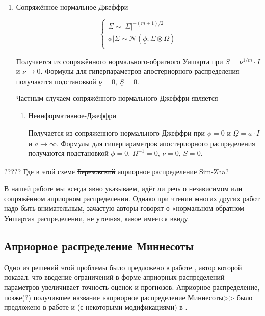 \documentclass[11pt]{article} %
\newcommand{\cN}{\mathcal{N}}
\newcommand{\prior}{\underline}
\begin{document}
\begin{enumerate}
\begin{enumerate}
\item Сопряжённое нормальное-Джеффри


\begin{equation}
\begin{cases}
\Sigma \sim |\Sigma|^{-(m+1)/2} \\
\phi | \Sigma \sim \cN(\prior\phi; \Sigma \otimes \prior\Omega ) \\
\end{cases}
\end{equation}




Получается из сопряжённого нормального-обратного Уишарта при $\prior S
= \prior \nu^{1/m}\cdot I$ и  $\prior \nu \to 0$.  Формулы для
гиперпараметров апостериорного распределения получаются подстановкой
$\prior\nu=0$, $\prior S=0$.


Частным случаем сопряжённого нормального-Джеффри является

\begin{enumerate}

\item Неинформативное-Джеффри


Получается из сопряженного нормального-Джеффри при $\prior\phi=0$ и
$\prior\Omega= a\cdot I$ и $a\to \infty$. Формулы для гиперпараметров
апостериорного распределения получаются подстановкой $\prior\phi=0$,
$\prior\Omega^{-1}=0$, $\prior\nu=0$, $\prior S=0$.

\end{enumerate}



\end{enumerate}


\end{enumerate}



????? Где в этой схеме \st{Березовский} априорное распределение Sim-Zha?



В нашей работе мы всегда явно указываем, идёт ли речь о независимом
или сопряжённом априорном распределении. Однако при чтении многих
других работ надо быть внимательным, зачастую авторы говорят о
«нормальном-обратном Уишарта» распределении, не уточняя, какое имеется
ввиду.

\subsection{Априорное распределение Миннесоты}


Одно из решений этой проблемы было предложено в работе \cite{litterman_1979}, автор которой показал, что введение ограничений в форме априорных распределений параметров увеличивает точность оценок и прогнозов. Априорное распределение, позже(?) получившее название «априорное распределение Миннесоты>> было предложено в работе  \cite{litterman_1986} и (с некоторыми модификациями) в \cite{doan_al_1984}.
\end{document}
